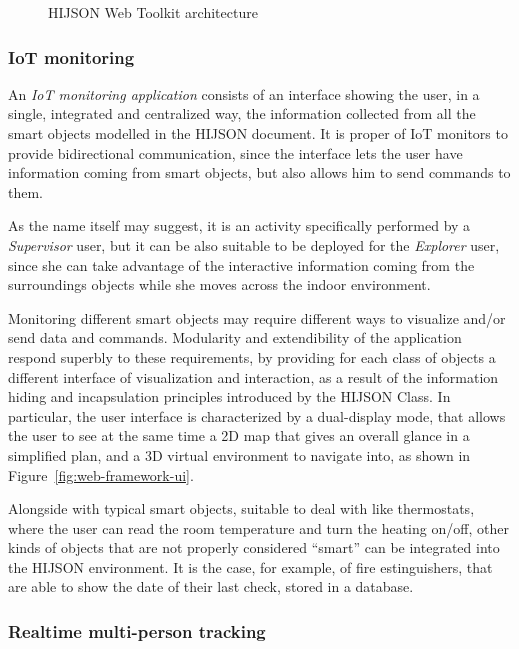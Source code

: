 \begin{figure*}[htb]
\centering
{}
\caption{HIJSON Web Toolkit architecture}
\label{fig:architecture}
\end{figure*}


\subsubsection{IoT monitoring}\label{iot-monitoring}

An \emph{IoT monitoring application} consists of an interface showing the user, in a single, integrated and centralized way, the information collected from all the smart objects modelled in the HIJSON document.
It is proper of IoT monitors to provide bidirectional communication, since the interface lets the user have information coming from smart objects, but also allows him to send commands to them. 

As the name itself may suggest, it is an activity specifically performed by a \emph{Supervisor} user, but it can be also suitable to be deployed for the \emph{Explorer} user, since she can take advantage of the interactive information coming from the surroundings objects while she moves across the indoor environment.

Monitoring different smart objects may require different ways to visualize and/or send data and commands.
Modularity and extendibility of the application respond superbly to these requirements, by providing for each class of objects a different interface of visualization and interaction, as a result of the information hiding and incapsulation principles introduced by the HIJSON Class.
In particular, the user interface is characterized by a dual-display mode, that allows the user to see at the same time a 2D map that gives an overall glance in a simplified plan, and a 3D virtual environment to navigate into, as shown in Figure~\ref{fig:web-framework-ui}.

Alongside with typical smart objects, suitable to deal with like thermostats, where the user can read the room  temperature and turn the heating on/off, other kinds of objects that are not properly considered ``smart'' can be integrated into the HIJSON environment. It is the case, for example, of fire estinguishers, that are able to show the date of their last check, stored in a database.

\subsubsection{Realtime multi-person tracking}\label{realtime-multi-person-tracking}


